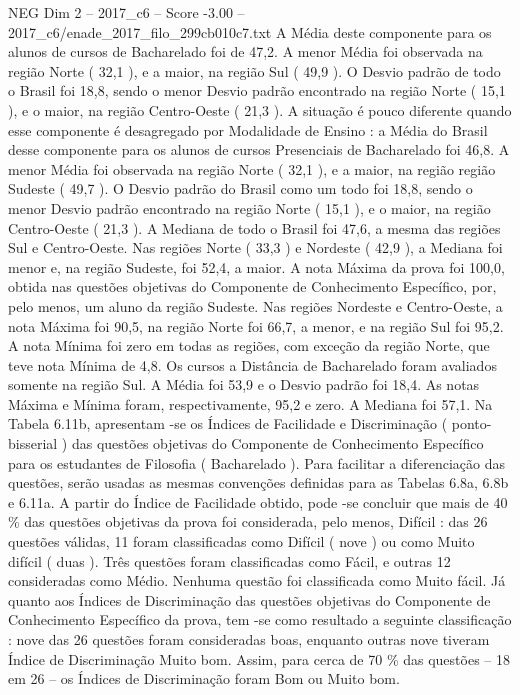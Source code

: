 \begin{textsample}{NEG Dim 2 – 2017\_c6 – Score -3.00 – 2017\_c6/enade\_2017\_filo\_299cb010c7.txt}
A Média deste componente para os alunos de cursos de Bacharelado foi de 47,2.
A menor Média foi observada na região Norte ( 32,1 ), e a maior, na região Sul ( 49,9 ).
O Desvio padrão de todo o Brasil foi 18,8, sendo o menor Desvio padrão encontrado na região Norte ( 15,1 ), e o maior, na região Centro-Oeste ( 21,3 ).
A situação é pouco diferente quando esse componente é desagregado por Modalidade de Ensino : a Média do Brasil desse componente para os alunos de cursos Presenciais de Bacharelado foi 46,8.
A menor Média foi observada na região Norte ( 32,1 ), e a maior, na região região Sudeste ( 49,7 ).
O Desvio padrão do Brasil como um todo foi 18,8, sendo o menor Desvio padrão encontrado na região Norte ( 15,1 ), e o maior, na região Centro-Oeste ( 21,3 ).
A Mediana de todo o Brasil foi 47,6, a mesma das regiões Sul e Centro-Oeste.
Nas regiões Norte ( 33,3 ) e Nordeste ( 42,9 ), a Mediana foi menor e, na região Sudeste, foi 52,4, a maior.
A nota Máxima da prova foi 100,0, obtida nas questões objetivas do Componente de Conhecimento Específico, por, pelo menos, um aluno da região Sudeste.
Nas regiões Nordeste e Centro-Oeste, a nota Máxima foi 90,5, na região Norte foi 66,7, a menor, e na região Sul foi 95,2.
A nota Mínima foi zero em todas as regiões, com exceção da região Norte, que teve nota Mínima de 4,8.
Os cursos a Distância de Bacharelado foram avaliados somente na região Sul.
A Média foi 53,9 e o Desvio padrão foi 18,4.
As notas Máxima e Mínima foram, respectivamente, 95,2 e zero.
A Mediana foi 57,1.
Na Tabela 6.11b, apresentam -se os Índices de Facilidade e Discriminação ( ponto-bisserial ) das questões objetivas do Componente de Conhecimento Específico para os estudantes de Filosofia ( Bacharelado ).
Para facilitar a diferenciação das questões, serão usadas as mesmas convenções definidas para as Tabelas 6.8a, 6.8b e 6.11a.
A partir do Índice de Facilidade obtido, pode -se concluir que mais de 40 \% das questões objetivas da prova foi considerada, pelo menos, Difícil : das 26 questões válidas, 11 foram classificadas como Difícil ( nove ) ou como Muito difícil ( duas ).
Três questões foram classificadas como Fácil, e outras 12 consideradas como Médio.
Nenhuma questão foi classificada como Muito fácil.
Já quanto aos Índices de Discriminação das questões objetivas do Componente de Conhecimento Específico da prova, tem -se como resultado a seguinte classificação : nove das 26 questões foram consideradas boas, enquanto outras nove tiveram Índice de Discriminação Muito bom.
Assim, para cerca de 70 \% das questões – 18 em 26 – os Índices de Discriminação foram Bom ou Muito bom.

\end{textsample}

